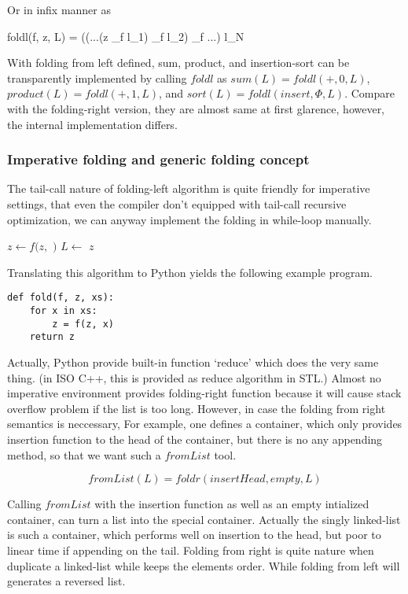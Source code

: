 \documentclass{article}
\begin{document}
Or in infix manner as

\be
foldl(f, z, L) = ((...(z \oplus_f l_1) \oplus_f l_2) \oplus_f ...) \oplus l_N
\ee

With folding from left defined, sum, product, and insertion-sort can be transparently implemented by calling
$foldl$ as $sum(L) = foldl(+, 0, L)$, $product(L) = foldl(+, 1, L)$, and $sort(L) = foldl(insert, \Phi, L)$.
Compare with the folding-right version, they are almost same at first glarence, however, the internal implementation
differs.

\subsubsection{Imperative folding and generic folding concept}
The tail-call nature of folding-left algorithm is quite friendly for imperative settings, that even the compiler
don't equipped with tail-call recursive optimization, we can anyway implement the folding in while-loop manually.

\begin{algorithmic}
    \State $z \gets f(z, $  $)$
    \State $L \gets$ 
  \EndWhile
  \State \Return $z$
\EndFunction
\end{algorithmic}

Translating this algorithm to Python yields the following example program.

\lstset{language=Python}
\begin{lstlisting}
def fold(f, z, xs):
    for x in xs:
        z = f(z, x)
    return z
\end{lstlisting}

Actually, Python provide built-in function `reduce' which does the very same thing. (in ISO C++, this is
provided as reduce algorithm in STL.) Almost no imperative environment provides folding-right function because
it will cause stack overflow problem if the list is too long. However, in case the folding from right
semantics is neccessary, For example, one defines a container, which only provides insertion function to
the head of the container, but there is no any appending method, so that we want such a $fromList$
tool.

\[
fromList(L) = foldr(insertHead, empty, L)
\]

Calling $fromList$ with the insertion function as well as an empty intialized container, can turn a list 
into the special container. Actually the singly linked-list is such a container, which performs well
on insertion to the head, but poor to linear time if appending on the tail. Folding from right is quite
nature when duplicate a linked-list while keeps the elements order. While folding from left will generates
a reversed list.
\end{document}
